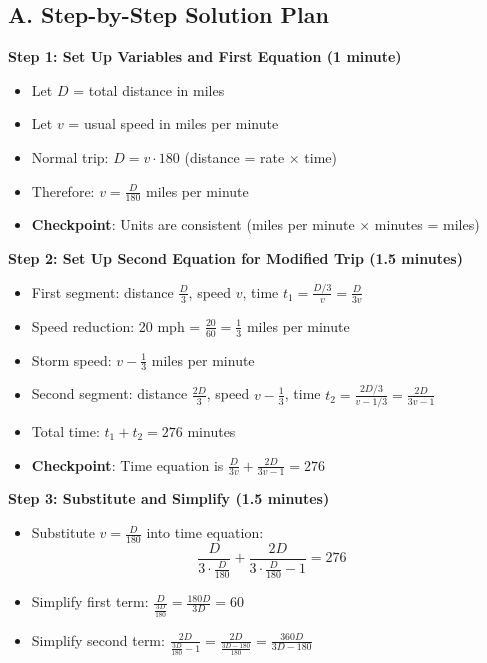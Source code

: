 \documentclass[11pt]{article}
\begin{document}
\begin{roadmapbox}
\subsection*{A. Step-by-Step Solution Plan}

\textbf{Step 1: Set Up Variables and First Equation (1 minute)}
\begin{itemize}[leftmargin=*]
    \item Let $D$ = total distance in miles
    \item Let $v$ = usual speed in miles per minute
    \item Normal trip: $D = v \cdot 180$ (distance = rate × time)
    \item Therefore: $v = \frac{D}{180}$ miles per minute
    \item \textbf{Checkpoint}: Units are consistent (miles per minute × minutes = miles)
\end{itemize}

\textbf{Step 2: Set Up Second Equation for Modified Trip (1.5 minutes)}
\begin{itemize}[leftmargin=*]
    \item First segment: distance $\frac{D}{3}$, speed $v$, time $t_1 = \frac{D/3}{v} = \frac{D}{3v}$
    \item Speed reduction: 20 mph = $\frac{20}{60} = \frac{1}{3}$ miles per minute
    \item Storm speed: $v - \frac{1}{3}$ miles per minute
    \item Second segment: distance $\frac{2D}{3}$, speed $v - \frac{1}{3}$, time $t_2 = \frac{2D/3}{v - 1/3} = \frac{2D}{3v - 1}$
    \item Total time: $t_1 + t_2 = 276$ minutes
    \item \textbf{Checkpoint}: Time equation is $\frac{D}{3v} + \frac{2D}{3v-1} = 276$
\end{itemize}

\textbf{Step 3: Substitute and Simplify (1.5 minutes)}
\begin{itemize}[leftmargin=*]
    \item Substitute $v = \frac{D}{180}$ into time equation:
    \[\frac{D}{3 \cdot \frac{D}{180}} + \frac{2D}{3 \cdot \frac{D}{180} - 1} = 276\]
    
    \item Simplify first term: $\frac{D}{\frac{3D}{180}} = \frac{180D}{3D} = 60$
    
    \item Simplify second term: $\frac{2D}{\frac{3D}{180} - 1} = \frac{2D}{\frac{3D - 180}{180}} = \frac{360D}{3D - 180}$
    

\end{itemize}
\end{roadmapbox}
\end{document}

